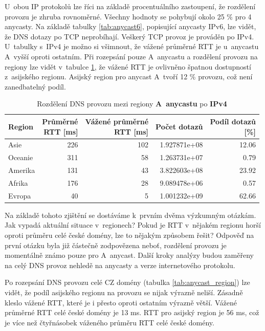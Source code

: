 \documentclass[thesis=M,czech]{src/FITthesis}[2019/12/23]
\begin{document}
U~obou IP protokolů lze říci na základě procentuálního zastoupení, že rozdělení provozu je zhruba rovnoměrné. Všechny hodnoty se pohybují okolo 25 \% pro 4 anycasty. Na základě tabulky \ref{tab:anycast6}, popisující anycasty IPv6, lze vidět, že DNS dotazy po TCP neprobíhají. Veškerý TCP provoz je prováděn po IPv4. U~tabulky s~IPv4 je možno si všimnout, že vážené průměrné RTT je u~anycastu A~vyšší oproti ostatním. Při rozepsání pouze A~anycastu a rozdělení provozu na regiony lze vidět v~tabulce \ref{tab:anycast_a4_region}, že vážené RTT je ovlivněno špatnou dostupností z~asijského regionu. Asijský region pro anycast A~tvoří 12 \% provozu, což není zanedbatelný podíl.  

\begin{table}
\centering
\begin{tabular}{lrrrr}
\toprule
{Region} & \makecell{Průměrné\\RTT [ms]} &  \makecell{Vážené průměrné\\RTT [ms]} &  Počet dotazů &  \makecell{Podíl dotazů\\\ [\%]} \\
\midrule
      Asie & 226 & 102 & 1.927871e+08 & 12.06 \\
   Oceanie & 311 &  58 & 1.263731e+07 & 0.79 \\
  Amerika & 131 &  43 & 3.822603e+08 & 23.92 \\
    Afrika & 176 &  28 & 9.089478e+06 & 0.57 \\
    Evropa &  40 &   5 & 1.001232e+09 & 62.66 \\
                                                
\bottomrule
\end{tabular}
 	\caption[]{Rozdělení DNS provozu mezi regiony \textbf{A~anycastu} po \textbf{IPv4}} 
 	\label{tab:anycast_a4_region}
\end{table}

Na základě tohoto zjištění se dostáváme k~prvním dvěma výzkumným otázkám. Jak vypadá aktuální situace v~regionech? Pokud je RTT v~nějakém regionu horší oproti průměru celé české domény, lze to nějakým způsobem řešit? Odpověď na první otázku byla již částečně zodpovězena neboť, rozdělení provozu je momentálně známo pouze pro A~anycast. Další kroky analýzy budou zaměřeny na celý DNS provoz nehledě na anycasty a verze internetového protokolu. 

Po rozepsání DNS provozu celé CZ domény (tabulka \ref{tab:anycast_region}) lze vidět, že podíl asijského regionu na provozu se nijak výrazně neliší. Zásadně kleslo vážené RTT, které je i přesto oproti ostatním výrazně větší. Vážené průměrné RTT celé české domény je 13 ms. RTT pro asijský region je 56 ms, což je více než čtyřnásobek váženého průměru RTT celé české domény.
\end{document}
